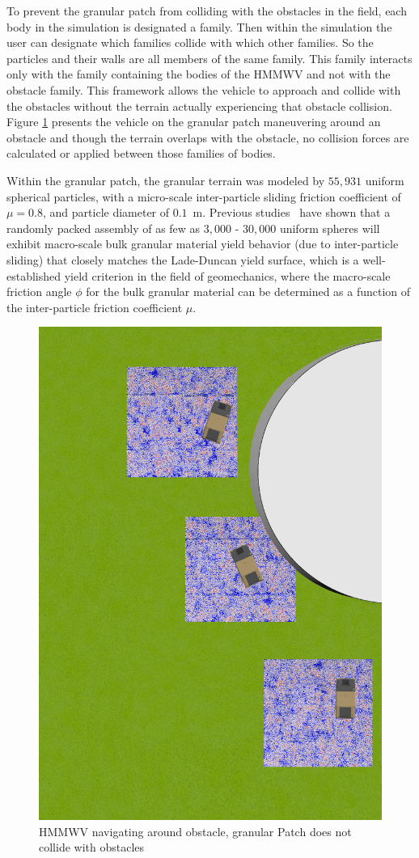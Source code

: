 \documentclass[12pt,onecolumn]{report}
\begin{document}
To prevent the granular patch from colliding with the obstacles in the field, each body in the simulation is designated a family. Then within the simulation the user can designate which families collide with which other families. So the particles and their walls are all members of the same family. This family interacts only with the family containing the bodies of the HMMWV and not with the obstacle family. This framework allows the vehicle to approach and collide with the obstacles without the terrain actually experiencing that obstacle collision. Figure \ref{fig:relocationAroundObstacle} presents the vehicle on the granular patch maneuvering around an obstacle and though the terrain overlaps with the obstacle, no collision forces are calculated or applied between those families of bodies.

Within the granular patch, the granular terrain was modeled by $55,931$ uniform spherical particles, with a micro-scale inter-particle sliding friction coefficient of $\mu = 0.8$, and particle diameter of $0.1$~m.  Previous studies~\cite{fleischmannetalGEGE2014} have shown that 
a randomly packed assembly of as few as $3,000$ - $30,000$ uniform spheres will exhibit macro-scale bulk granular material yield behavior (due to inter-particle sliding) that closely matches the Lade-Duncan yield surface, which is a well-established yield criterion in the field of geomechanics, where the macro-scale friction angle $\phi$ for the bulk granular material can be determined as a function of the inter-particle friction coefficient $\mu$.

\begin{figure}
	\centering
	\includegraphics[width=0.8\columnwidth]{Figs/aroundObstacle.png}
	\caption{\small HMMWV navigating around obstacle, granular Patch does not collide with obstacles}
	\label{fig:relocationAroundObstacle}
\end{figure}
\end{document}
